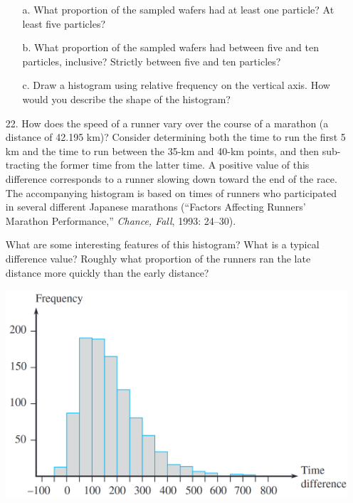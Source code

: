 \documentclass[letterpaper,12pt]{article}
\begin{document}
\begin{enumerate}
\begin{enumerate}
      \item[a.]
        What proportion of the sampled wafers had at least one particle? At least five particles?
      \item[b.]
        What proportion of the sampled wafers had between five and ten particles, inclusive? Strictly between five and ten particles?
      \item[c.]
        Draw a histogram using relative frequency on the vertical axis. How would you describe the shape of the histogram?
    \end{enumerate}
  \item[22.]
    How does the speed of a runner vary over the course of a marathon (a distance of 42.195 km)? Consider determining both the time to run the first 5 km and the time to run between the 35-km and 40-km points, and then sub-
    tracting the former time from the latter time. A positive value of this difference corresponds to a runner slowing down toward the end of the race. The accompanying histogram is based on times of runners who participated in several different Japanese marathons (``Factors Affecting Runners’ Marathon Performance,'' \textit{Chance, Fall}, 1993: 24–30).

    What are some interesting features of this histogram? What is a typical difference value? Roughly what proportion of the runners ran the late distance more quickly than the early distance?

    \begin{center}
      \includegraphics[scale=0.3]{../resources/01_02_22_01.png}
    \end{center}
\end{enumerate}
\end{document}
